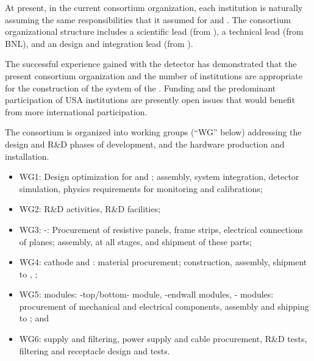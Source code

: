 At present, in the  current consortium organization, each institution is naturally assuming the same responsibilities that it assumed for %
 and . The %
consortium organizational structure includes a scientific lead (from ), a technical lead (from BNL), %
and an  design and integration lead (from ). 

The successful experience gained with the  detector has demonstrated that the present  consortium organization and the number of institutions are appropriate for the construction of the  system of the . Funding and the predominant participation of USA institutions are presently open issues that would benefit from more international participation. %

 The consortium is organized into working groups (``WG'' below) addressing the design and  R\&D phases of development, and the hardware production and installation.

\begin{itemize}
\item WG1: Design optimization for  and ; assembly, system integration, detector simulation, physics requirements for monitoring and calibrations; %
\item WG2: R\&D activities, R\&D facilities; %
\item WG3: -: Procurement of resistive panels, frame strips, electrical connections of planes; assembly,  at all stages, and shipment of these parts; \item WG4:  cathode and :  material procurement; construction, assembly, shipment to  %
, ; %
\item WG5:  modules: -top/bottom- module, -endwall modules, - modules: procurement of mechanical and electrical components, assembly and shipping to ; and  %
\item WG6:  supply and filtering,  power supply and cable procurement, R\&D tests, filtering and receptacle design and tests. %
\end{itemize}

